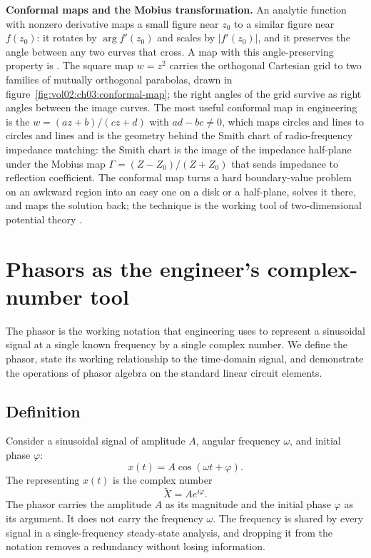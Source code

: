 \begin{mastery}
\textbf{Conformal maps and the Mobius transformation.} An analytic
function with nonzero derivative maps a small figure near $z_{0}$ to a
similar figure near $f(z_{0})$: it rotates by $\arg f'(z_{0})$ and
scales by $|f'(z_{0})|$, and it preserves the angle between any two
curves that cross. A map with this angle-preserving property is
. The square map $w = z^{2}$ carries the orthogonal
Cartesian grid to two families of mutually orthogonal parabolas, drawn
in figure~\ref{fig:vol02:ch03:conformal-map}; the right angles of the
grid survive as right angles between the image curves. The most useful
conformal map in engineering is the 
$w = (az + b)/(cz + d)$ with $ad - bc \ne 0$, which maps circles and
lines to circles and lines and is the geometry behind the Smith chart
of radio-frequency impedance matching: the Smith chart is the image of
the impedance half-plane under the Mobius map
$\Gamma = (Z - Z_{0})/(Z + Z_{0})$ that sends impedance to reflection
coefficient. The conformal map turns a hard boundary-value problem on
an awkward region into an easy one on a disk or a half-plane, solves it
there, and maps the solution back; the technique is the working tool
of two-dimensional potential theory
\cite[chapter 6]{text:v2ch03-needham-visual-complex}.
\end{mastery}



\section{Phasors as the engineer's complex-number tool}

The phasor is the working notation that engineering uses to
represent a sinusoidal signal at a single known frequency by a
single complex number. We define the phasor, state its working
relationship to the time-domain signal, and demonstrate the
operations of phasor algebra on the standard linear circuit
elements.

\subsection{Definition}

Consider a sinusoidal signal of amplitude $A$, angular frequency
$\omega$, and initial phase $\varphi$:
\[
x(t) = A \cos(\omega t + \varphi).
\]
The  representing $x(t)$ is the complex number
\[
\tilde{X} = A e^{i\varphi}.
\]
The phasor carries the amplitude $A$ as its magnitude and the
initial phase $\varphi$ as its argument. It does not carry the
frequency $\omega$. The frequency is shared by every signal in a
single-frequency steady-state analysis, and dropping it from the
notation removes a redundancy without losing information.

